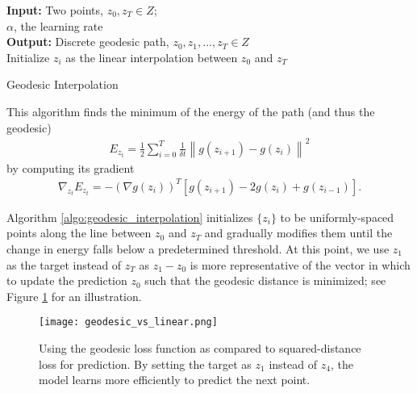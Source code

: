 \documentclass[runningheads]{llncs}
\newcommand{\norm}[1]{\left\lVert#1\right\rVert}
\begin{document}
   \begin{algorithm} [H]
      \SetAlgoLined
      \textbf{Input: } Two points, $z_{0}, z_{T} \in Z$; \\
      $\alpha$, the learning rate \\
      \textbf{Output: } Discrete geodesic path, $z_{0}, z_{1}, ..., z_{T} \in Z$ \\
      Initialize $z_{i}$ as the linear interpolation between $z_{0}$ and $z_{T}$  \\
      {
      }
      \caption{Geodesic Interpolation}
      \label{algo:geodesic_interpolation}
   \end{algorithm}

   This algorithm finds the minimum of the energy of the path (and thus the geodesic)
   \begin{align}
   E_{z_t} = \frac{1}{2} \sum_{i=0}^T \frac{1}{\delta t} \norm{g(z_{i+1}) - g(z_i)}^2
   \end{align}
   by computing its gradient
   \begin{align}
   \nabla_{z_t} E_{z_t} = - \left( \nabla g (z_i) \right)^T \left[g(z_{i+1}) - 2g(z_i) + g(z_{i-1}) \right].
   \label{eq:energy_gradient}
   \end{align}

	Algorithm \ref{algo:geodesic_interpolation} initializes $\{z_i\}$ to be uniformly-spaced points along the line between $z_0$ and $z_T$ and gradually modifies them until the change in energy falls below a predetermined threshold. At this point, we use $z_1$ as the target instead of $z_T$ as $z_1 - z_0$ is more representative of the vector in which to update the prediction $z_0$ such that the geodesic distance is minimized; see Figure \ref{fig:geodesic_loss} for an illustration. \par
    
	 \begin{figure} [H]
      \centering  
\texttt{[image: geodesic\_vs\_linear.png]}      
      \caption{Using the geodesic loss function as compared to squared-distance loss for prediction. By setting the target as $z_1$ instead of $z_4$, the model learns more efficiently to predict the next point.}
      \label{fig:geodesic_loss}
   \end{figure}
\end{document}
